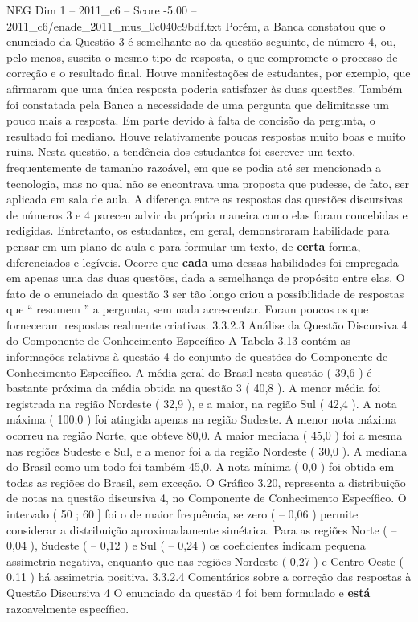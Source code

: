 \begin{textsample}{NEG Dim 1 – 2011\_c6 – Score -5.00 – 2011\_c6/enade\_2011\_mus\_0c040c9bdf.txt}
Porém, a Banca constatou que o enunciado da Questão 3 é semelhante ao da questão seguinte, de número 4, ou, pelo menos, suscita o mesmo tipo de resposta, o que compromete o processo de correção e o resultado final.
Houve manifestações de estudantes, por exemplo, que afirmaram que uma única resposta poderia satisfazer às duas questões.
Também foi constatada pela Banca a necessidade de uma pergunta que delimitasse um pouco mais a resposta.
Em parte devido à falta de concisão da pergunta, o resultado foi mediano.
Houve relativamente poucas respostas muito boas e muito ruins.
Nesta questão, a tendência dos estudantes foi escrever um texto, frequentemente de tamanho razoável, em que se podia até ser mencionada a tecnologia, mas no qual não se encontrava uma proposta que pudesse, de fato, ser aplicada em sala de aula.
A diferença entre as respostas das questões discursivas de números 3 e 4 pareceu advir da própria maneira como elas foram concebidas e redigidas.
Entretanto, os estudantes, em geral, demonstraram habilidade para pensar em um plano de aula e para formular um texto, de \textbf{certa} forma, diferenciados e legíveis.
Ocorre que \textbf{cada} uma dessas habilidades foi empregada em apenas uma das duas questões, dada a semelhança de propósito entre elas.
O fato de o enunciado da questão 3 ser tão longo criou a possibilidade de respostas que “ resumem ” a pergunta, sem nada acrescentar.
Foram poucos os que forneceram respostas realmente criativas. 3.3.2.3 Análise da Questão Discursiva 4 do Componente de Conhecimento Específico A Tabela 3.13 contém as informações relativas à questão 4 do conjunto de questões do Componente de Conhecimento Específico.
A média geral do Brasil nesta questão ( 39,6 ) é bastante próxima da média obtida na questão 3 ( 40,8 ).
A menor média foi registrada na região Nordeste ( 32,9 ), e a maior, na região Sul ( 42,4 ).
A nota máxima ( 100,0 ) foi atingida apenas na região Sudeste.
A menor nota máxima ocorreu na região Norte, que obteve 80,0.
A maior mediana ( 45,0 ) foi a mesma nas regiões Sudeste e Sul, e a menor foi a da região Nordeste ( 30,0 ).
A mediana do Brasil como um todo foi também 45,0.
A nota mínima ( 0,0 ) foi obtida em todas as regiões do Brasil, sem exceção.
O Gráfico 3.20, representa a distribuição de notas na questão discursiva 4, no Componente de Conhecimento Específico.
O intervalo ( 50 ; 60 ] foi o de maior frequência, se zero ( – 0,06 ) permite considerar a distribuição aproximadamente simétrica.
Para as regiões Norte ( – 0,04 ), Sudeste ( – 0,12 ) e Sul ( – 0,24 ) os coeficientes indicam pequena assimetria negativa, enquanto que nas regiões Nordeste ( 0,27 ) e Centro-Oeste ( 0,11 ) há assimetria positiva. 3.3.2.4 Comentários sobre a correção das respostas à Questão Discursiva 4 O enunciado da questão 4 foi bem formulado e \textbf{está} razoavelmente específico.

\end{textsample}
